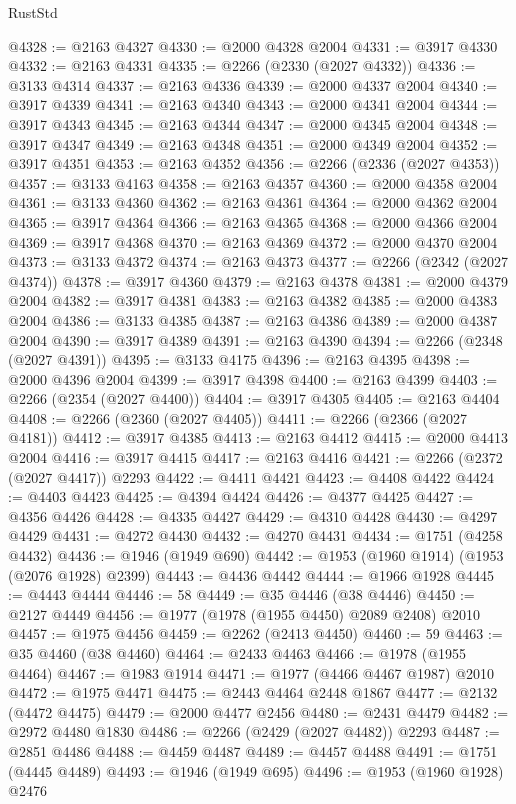 \begin{lexlean}{RustStd}
\begin{coremodule}
@4328 := @2163 @4327
@4330 := @2000 @4328 @2004
@4331 := @3917 @4330
@4332 := @2163 @4331
@4335 := @2266 (@2330 (@2027 @4332))
@4336 := @3133 @4314
@4337 := @2163 @4336
@4339 := @2000 @4337 @2004
@4340 := @3917 @4339
@4341 := @2163 @4340
@4343 := @2000 @4341 @2004
@4344 := @3917 @4343
@4345 := @2163 @4344
@4347 := @2000 @4345 @2004
@4348 := @3917 @4347
@4349 := @2163 @4348
@4351 := @2000 @4349 @2004
@4352 := @3917 @4351
@4353 := @2163 @4352
@4356 := @2266 (@2336 (@2027 @4353))
@4357 := @3133 @4163
@4358 := @2163 @4357
@4360 := @2000 @4358 @2004
@4361 := @3133 @4360
@4362 := @2163 @4361
@4364 := @2000 @4362 @2004
@4365 := @3917 @4364
@4366 := @2163 @4365
@4368 := @2000 @4366 @2004
@4369 := @3917 @4368
@4370 := @2163 @4369
@4372 := @2000 @4370 @2004
@4373 := @3133 @4372
@4374 := @2163 @4373
@4377 := @2266 (@2342 (@2027 @4374))
@4378 := @3917 @4360
@4379 := @2163 @4378
@4381 := @2000 @4379 @2004
@4382 := @3917 @4381
@4383 := @2163 @4382
@4385 := @2000 @4383 @2004
@4386 := @3133 @4385
@4387 := @2163 @4386
@4389 := @2000 @4387 @2004
@4390 := @3917 @4389
@4391 := @2163 @4390
@4394 := @2266 (@2348 (@2027 @4391))
@4395 := @3133 @4175
@4396 := @2163 @4395
@4398 := @2000 @4396 @2004
@4399 := @3917 @4398
@4400 := @2163 @4399
@4403 := @2266 (@2354 (@2027 @4400))
@4404 := @3917 @4305
@4405 := @2163 @4404
@4408 := @2266 (@2360 (@2027 @4405))
@4411 := @2266 (@2366 (@2027 @4181))
@4412 := @3917 @4385
@4413 := @2163 @4412
@4415 := @2000 @4413 @2004
@4416 := @3917 @4415
@4417 := @2163 @4416
@4421 := @2266 (@2372 (@2027 @4417)) @2293
@4422 := @4411 @4421
@4423 := @4408 @4422
@4424 := @4403 @4423
@4425 := @4394 @4424
@4426 := @4377 @4425
@4427 := @4356 @4426
@4428 := @4335 @4427
@4429 := @4310 @4428
@4430 := @4297 @4429
@4431 := @4272 @4430
@4432 := @4270 @4431
@4434 := @1751 (@4258 @4432)
@4436 := @1946 (@1949 @690)
@4442 := @1953 (@1960 @1914) (@1953 (@2076 @1928) @2399)
@4443 := @4436 @4442
@4444 := @1966 @1928
@4445 := @4443 @4444
@4446 := 58
@4449 := @35 @4446 (@38 @4446)
@4450 := @2127 @4449
@4456 := @1977 (@1978 (@1955 @4450) @2089 @2408) @2010
@4457 := @1975 @4456
@4459 := @2262 (@2413 @4450)
@4460 := 59
@4463 := @35 @4460 (@38 @4460)
@4464 := @2433 @4463
@4466 := @1978 (@1955 @4464)
@4467 := @1983 @1914
@4471 := @1977 (@4466 @4467 @1987) @2010
@4472 := @1975 @4471
@4475 := @2443 @4464 @2448 @1867
@4477 := @2132 (@4472 @4475)
@4479 := @2000 @4477 @2456
@4480 := @2431 @4479
@4482 := @2972 @4480 @1830
@4486 := @2266 (@2429 (@2027 @4482)) @2293
@4487 := @2851 @4486
@4488 := @4459 @4487
@4489 := @4457 @4488
@4491 := @1751 (@4445 @4489)
@4493 := @1946 (@1949 @695)
@4496 := @1953 (@1960 @1928) @2476

\end{coremodule}
\end{lexlean}
